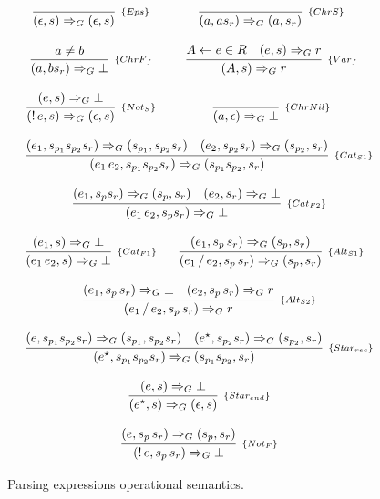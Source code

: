 \documentclass[preprint,12pt]{elsarticle}
\theoremstyle{definition}
\begin{document}
\begin{figure}[h!]
   \[
      \begin{array}{cc}
         \infer[_{\{Eps\}}]{(\epsilon,s)\Rightarrow_G (\epsilon,s)}{} &
         \infer[_{\{ChrS\}}]{(a,as_r) \Rightarrow_G (a,s_r)}{} \\ \\
         \infer[_{\{ChrF\}}]{(a,bs_r) \Rightarrow_G \bot}{a \neq b} &
         \infer[_{\{Var\}}]{(A,s) \Rightarrow_G r}
                           {A \leftarrow e \in R & (e,s) \Rightarrow_G r} \\ \\
         \infer[_{\{Not_S\}}]{(!\,e,s) \Rightarrow_G (\epsilon,s)}
         {(e,s) \Rightarrow_G \bot}
           &
         \infer[_{\{ChrNil\}}]{(a,\epsilon) \Rightarrow_G \bot}{}\\ \\

         \multicolumn{2}{c}{
            \infer[_{\{Cat_{S1}\}}]{(e_1\,e_2,s_{p_1}s_{p_2}s_r) \Rightarrow_G (s_{p_1}s_{p_2}, s_r)}
                                 {(e_1,s_{p_1}s_{p_2}s_r) \Rightarrow_G (s_{p_1},s_{p_2}s_r) &
                                 (e_2,s_{p_2}s_r)\Rightarrow_G (s_{p_2},s_r)}
         } \\ \\
         \multicolumn{2}{c}{
            \infer[_{\{Cat_{F2}\}}]{(e_1\,e_2,s_ps_r) \Rightarrow_G \bot}
                                 { (e_1,s_ps_r) \Rightarrow_G (s_p,s_r) &
                                    (e_2,s_r) \Rightarrow_G \bot}} \\ \\
         \infer[_{\{Cat_{F1}\}}]{(e_1\,e_2,s)\Rightarrow_G \bot}{(e_1,s) \Rightarrow_G \bot} &
         \infer[_{\{Alt_{S1}\}}]{(e_1\,/\,e_2,s_p\,s_r) \Rightarrow_G (s_p,s_r)}
                                {(e_1,s_p\,s_r)\Rightarrow_G (s_p,s_r)}\\ \\
         \multicolumn{2}{c}{
            \infer[_{\{Alt_{S2}\}}]{(e_1\,/\,e_2,s_p\,s_r) \Rightarrow_G r}
                                  {(e_1,s_p\,s_r)\Rightarrow_G \bot &
                                   (e_2,s_p\,s_r)\Rightarrow_G r}
         } \\ \\
         \multicolumn{2}{c}{
            \infer[_{\{Star_{rec}\}}]{(e^\star,s_{p_1}s_{p_2}s_r) \Rightarrow_G (s_{p_1}s_{p_2},s_r)}
                                 {(e,s_{p_1}s_{p_2}s_r) \Rightarrow_G (s_{p_1},s_{p_2}s_r) &
                                  (e^\star, s_{p_2}s_r) \Rightarrow_G (s_{p_2},s_r)}
         }\\ \\
         \multicolumn{2}{c}{
            \infer[_{\{Star_{end}\}}]{(e^\star,s) \Rightarrow_G (\epsilon,s)}
                                    {(e,s) \Rightarrow_G \bot}} \\ \\
         \multicolumn{2}{c}{
            \infer[_{\{Not_F\}}]{(!\,e,s_p\,s_r) \Rightarrow_G \bot}
                               {(e,s_p\,s_r) \Rightarrow_G (s_p,s_r)}
         }
     \end{array}
   \]
   \centering
   \caption{Parsing expressions operational semantics.}
   \label{fig:pegsemantics}
\end{figure}
\end{document}
